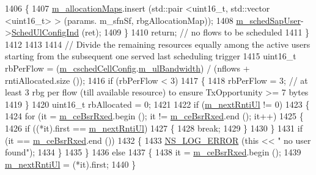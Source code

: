 \begin{DoxyCode}
1406         \{
1407           \hyperlink{classns3_1_1RrFfMacScheduler_a9554a5b41b05461bdbcd12dcdecb34ea}{m\_allocationMaps}.insert (std::pair <uint16\_t, std::vector <uint16\_t> > (params.
      m\_sfnSf, rbgAllocationMap));
1408           \hyperlink{classns3_1_1RrFfMacScheduler_a1d834e008836f5b748b81d8d3dc5f926}{m\_schedSapUser}->\hyperlink{classns3_1_1FfMacSchedSapUser_a1b89636256701a84d990db7db8aea874}{SchedUlConfigInd} (ret);
1409         \}
1410       \textcolor{keywordflow}{return};  \textcolor{comment}{// no flows to be scheduled}
1411     \}
1412 
1413 
1414   \textcolor{comment}{// Divide the remaining resources equally among the active users starting from the subsequent one served
       last scheduling trigger}
1415   uint16\_t rbPerFlow = (\hyperlink{classns3_1_1RrFfMacScheduler_a809c6237863709f97fc450b1a2ba60d4}{m\_cschedCellConfig}.\hyperlink{structns3_1_1FfMacCschedSapProvider_1_1CschedCellConfigReqParameters_a5ab5b102878e6e7e7727a14af4a64d2f}{m\_ulBandwidth}) / (nflows + 
      rntiAllocated.size ());
1416   \textcolor{keywordflow}{if} (rbPerFlow < 3)
1417     \{
1418       rbPerFlow = 3;  \textcolor{comment}{// at least 3 rbg per flow (till available resource) to ensure TxOpportunity >= 7
       bytes}
1419     \}
1420   uint16\_t rbAllocated = 0;
1421 
1422   \textcolor{keywordflow}{if} (\hyperlink{classns3_1_1RrFfMacScheduler_afd1cdb17c29e2a04980e4bea7d537e0f}{m\_nextRntiUl} != 0)
1423     \{
1424       \textcolor{keywordflow}{for} (it = \hyperlink{classns3_1_1RrFfMacScheduler_a1696bc07e1fdc0336106223f97b44298}{m\_ceBsrRxed}.begin (); it != \hyperlink{classns3_1_1RrFfMacScheduler_a1696bc07e1fdc0336106223f97b44298}{m\_ceBsrRxed}.end (); it++)
1425         \{
1426           \textcolor{keywordflow}{if} ((*it).first == \hyperlink{classns3_1_1RrFfMacScheduler_afd1cdb17c29e2a04980e4bea7d537e0f}{m\_nextRntiUl})
1427             \{
1428               \textcolor{keywordflow}{break};
1429             \}
1430         \}
1431       \textcolor{keywordflow}{if} (it == \hyperlink{classns3_1_1RrFfMacScheduler_a1696bc07e1fdc0336106223f97b44298}{m\_ceBsrRxed}.end ())
1432         \{
1433           \hyperlink{group__logging_ga0261a8db1d4ac5f79417d117634fd455}{NS\_LOG\_ERROR} (\textcolor{keyword}{this} << \textcolor{stringliteral}{" no user found"});
1434         \}
1435     \}
1436   \textcolor{keywordflow}{else}
1437     \{
1438       it = \hyperlink{classns3_1_1RrFfMacScheduler_a1696bc07e1fdc0336106223f97b44298}{m\_ceBsrRxed}.begin ();
1439       \hyperlink{classns3_1_1RrFfMacScheduler_afd1cdb17c29e2a04980e4bea7d537e0f}{m\_nextRntiUl} = (*it).first;
1440     \}

\end{DoxyCode}
